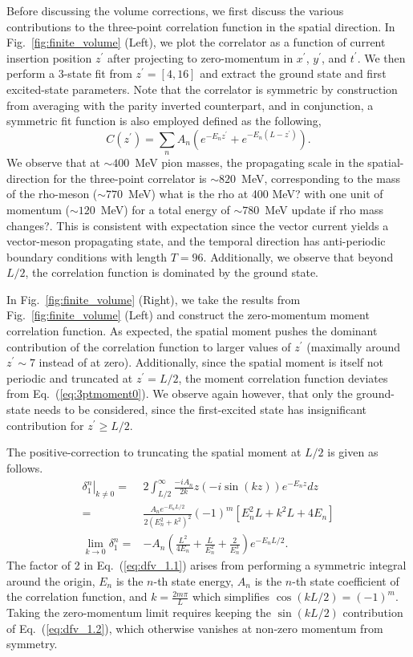 \documentclass[prd,aps,twocolumn,superscriptaddress,tightenlines,nofootinbib,floatfix,preprintnumbers,10pt]{revtex4-1}
\begin{document}
Before discussing the volume corrections, we first discuss the various contributions to the three-point correlation function in the spatial direction. In Fig.~\ref{fig:finite_volume} (Left), we plot the correlator as a function of current insertion position $z^\prime$ after projecting to zero-momentum in $x^\prime$, $y^\prime$, and $t^\prime$. We then perform a 3-state fit from $z^\prime = [4,16]$ and extract the ground state and first excited-state parameters. Note that the correlator is symmetric by construction from averaging with the parity inverted counterpart, and in conjunction, a symmetric fit function is also employed defined as the following,
\begin{equation}
C(z^\prime) = \sum_n A_n\left(e^{-E_n z^\prime} + e^{-E_n(L-z^\prime)}\right).
\end{equation} We observe that at $\sim 400$~MeV pion masses, the propagating scale in the spatial-direction for the three-point correlator is $\sim 820$~MeV, corresponding to the mass of the rho-meson ($\sim 770$~MeV) {\color{red} what is the rho at 400 MeV?} with one unit of momentum ($\sim 120$~MeV) for a total energy of $\sim780$~MeV {\color{red} update if rho mass changes?}. This is consistent with expectation since the vector current yields a vector-meson propagating state, and the temporal direction has anti-periodic boundary conditions with length $T=96$. Additionally, we observe that beyond $L/2$, the correlation function is dominated by the ground state.

In Fig.~\ref{fig:finite_volume} (Right), we take the results from Fig.~\ref{fig:finite_volume} (Left) and construct the zero-momentum moment correlation function. As expected, the spatial moment pushes the dominant contribution of the correlation function to larger values of $z^\prime$ (maximally around $z^\prime \sim 7$ instead of at zero). Additionally, since the spatial moment is itself not periodic and truncated at $z^\prime = L/2$, the moment correlation function deviates from Eq.~(\ref{eq:3ptmoment0}). We observe again however, that only the ground-state needs to be considered, since the first-excited state has insignificant contribution for $z^\prime \geq L/2$.

The positive-correction to truncating the spatial moment at $L/2$ is given as follows.
\begin{align}
\left.\delta^n_{1}\right|_{k\neq 0}= & 2\int_{L/2}^{\infty} \frac{-iA_n}{2k} z(-i \sin(kz))e^{-E_n z} dz \label{eq:dfv_1.1}\\
=& \frac{A_n e^{-E_n L/2}}{2(E_n^2+k^2)^2}(-1)^m\left[E_n^2L+k^2L+4E_n\right] \label{eq:dfv_1.2}\\
\lim_{k\rightarrow 0}\delta^n_{1} =& -A_n\left(\frac{L^2}{4E_n}+\frac{L}{E_n^2}+\frac{2}{E_n^3}\right)e^{-E_n L/2}. \label{eq:dfv_1.0}
\end{align}
The factor of 2 in Eq.~(\ref{eq:dfv_1.1}) arises from performing a symmetric integral around the origin, $E_n$ is the $n$-th state energy, $A_n$ is the $n$-th state coefficient of the correlation function, and $k=\frac{2m\pi}{L}$ which simplifies $\cos(kL/2) = (-1)^m$. Taking the zero-momentum limit requires keeping the $\sin({kL/2})$ contribution of Eq.~(\ref{eq:dfv_1.2}), which otherwise vanishes at non-zero momentum from symmetry.
\end{document}
